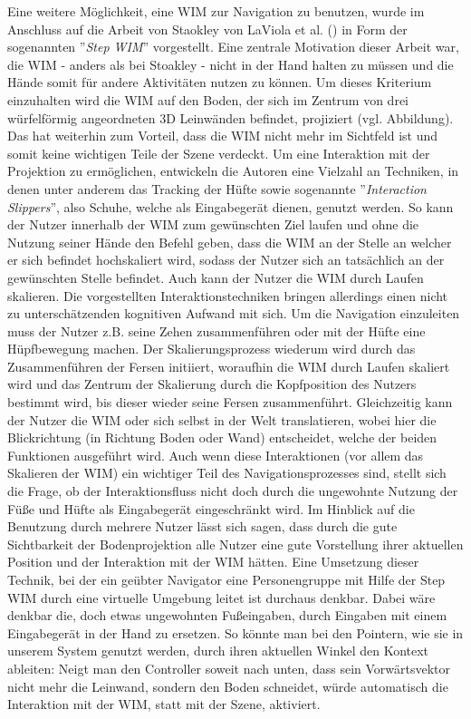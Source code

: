 Eine weitere Möglichkeit, eine WIM zur Navigation zu benutzen, wurde im Anschluss auf die Arbeit von Staokley von LaViola et al. (\cite{LaViola2004Hands-freeEnvironments}) in Form der sogenannten  ”\textit{Step WIM}”  vorgestellt.
Eine zentrale Motivation dieser Arbeit war, die WIM - anders als bei Stoakley - nicht in der Hand halten zu müssen und die Hände somit für andere Aktivitäten nutzen zu können. 
Um dieses Kriterium einzuhalten wird die WIM auf den Boden, der sich im Zentrum von drei würfelförmig angeordneten 3D Leinwänden befindet, projiziert (vgl. Abbildung). Das hat weiterhin zum Vorteil, dass die WIM nicht mehr im Sichtfeld ist und somit keine wichtigen Teile der Szene verdeckt. 
Um eine Interaktion mit der Projektion zu ermöglichen, entwickeln die Autoren eine Vielzahl an Techniken, in denen unter anderem das Tracking der Hüfte sowie sogenannte ”\textit{Interaction Slippers}”, also Schuhe, welche als Eingabegerät dienen, genutzt werden.
So kann der Nutzer innerhalb der WIM zum gewünschten Ziel laufen und ohne die Nutzung seiner Hände den Befehl geben, dass die WIM an der Stelle an welcher er sich befindet hochskaliert wird, sodass der Nutzer sich an tatsächlich an der gewünschten Stelle befindet.
Auch kann der Nutzer die WIM durch Laufen skalieren. Die vorgestellten Interaktionstechniken bringen allerdings einen nicht zu unterschätzenden kognitiven Aufwand mit sich. 
Um die Navigation einzuleiten muss der Nutzer z.B. seine Zehen zusammenführen oder mit der Hüfte eine Hüpfbewegung machen. Der Skalierungsprozess wiederum wird durch das Zusammenführen der Fersen initiiert, woraufhin die WIM durch Laufen skaliert wird und das Zentrum der Skalierung durch die Kopfposition des Nutzers bestimmt wird, bis dieser wieder seine Fersen zusammenführt. Gleichzeitig kann der Nutzer die WIM oder sich selbst in der Welt translatieren, wobei hier die Blickrichtung (in Richtung Boden oder Wand) entscheidet, welche der beiden Funktionen ausgeführt wird.
Auch wenn diese Interaktionen (vor allem das Skalieren der WIM) ein wichtiger Teil des Navigationsprozesses sind, stellt sich die Frage, ob der Interaktionsfluss nicht doch durch die ungewohnte Nutzung der Füße und Hüfte als Eingabegerät eingeschränkt wird.
Im Hinblick auf die Benutzung durch mehrere Nutzer lässt sich sagen, dass durch die gute Sichtbarkeit der Bodenprojektion alle Nutzer eine gute Vorstellung ihrer aktuellen Position und der Interaktion mit der WIM hätten. Eine Umsetzung dieser Technik, bei der ein geübter Navigator eine Personengruppe mit Hilfe der Step WIM durch eine virtuelle Umgebung leitet ist durchaus denkbar. Dabei wäre denkbar die, doch etwas ungewohnten Fußeingaben, durch Eingaben mit einem Eingabegerät in der Hand zu ersetzen. So könnte man bei den Pointern, wie sie in unserem System genutzt werden, durch ihren aktuellen Winkel den Kontext ableiten: Neigt man den Controller soweit nach unten, dass sein Vorwärtsvektor nicht mehr die Leinwand, sondern den Boden schneidet, würde automatisch die Interaktion mit der WIM, statt mit der Szene, aktiviert.

